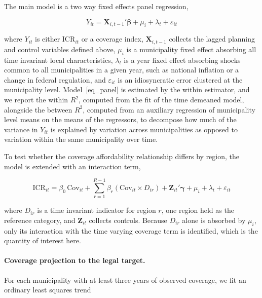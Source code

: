 \documentclass[pdflatex,sn-mathphys-num]{sn-jnl}%
\theoremstyle{thmstyleone}%
\theoremstyle{thmstyletwo}%
\theoremstyle{thmstylethree}%
\begin{document}
The main model is a two way fixed effects panel regression,

\begin{equation}
Y_{it} = \mathbf{X}_{i,t-1}' \boldsymbol{\beta} + \mu_i + \lambda_t + \varepsilon_{it}
\label{eq_panel}
\end{equation}

where $Y_{it}$ is either $\text{ICR}_{it}$ or a coverage index, $\mathbf{X}_{i,t-1}$ collects the lagged planning and control variables defined above, $\mu_i$ is a municipality fixed effect absorbing all time invariant local characteristics, $\lambda_t$ is a year fixed effect absorbing shocks common to all municipalities in a given year, such as national inflation or a change in federal regulation, and $\varepsilon_{it}$ is an idiosyncratic error clustered at the municipality level. Model~\eqref{eq_panel} is estimated by the within estimator, and we report the within $R^2$, computed from the fit of the time demeaned model, alongside the between $R^2$, computed from an auxiliary regression of municipality level means on the means of the regressors, to decompose how much of the variance in $Y_{it}$ is explained by variation across municipalities as opposed to variation within the same municipality over time.

To test whether the coverage affordability relationship differs by region, the model is extended with an interaction term,

\begin{equation}
\text{ICR}_{it} = \beta_0 \, \text{Cov}_{it} + \sum_{r=1}^{R-1} \beta_r \left(\text{Cov}_{it} \times D_{ir}\right) + \mathbf{Z}_{it}' \boldsymbol{\gamma} + \mu_i + \lambda_t + \varepsilon_{it}
\label{eq_interaction}
\end{equation}

where $D_{ir}$ is a time invariant indicator for region $r$, one region held as the reference category, and $\mathbf{Z}_{it}$ collects controls. Because $D_{ir}$ alone is absorbed by $\mu_i$, only its interaction with the time varying coverage term is identified, which is the quantity of interest here.

\paragraph{Coverage projection to the legal target.}

For each municipality with at least three years of observed coverage, we fit an ordinary least squares trend
\end{document}
